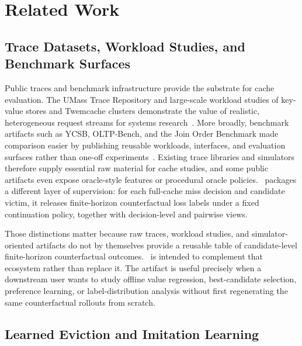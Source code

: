 \section{Related Work}
\label{sec:related-work}

\begingroup
\sloppy

\subsection{Trace Datasets, Workload Studies, and Benchmark Surfaces}

Public traces and benchmark infrastructure provide the substrate for cache evaluation. The UMass Trace Repository and large-scale workload studies of key-value stores and Twemcache clusters demonstrate the value of realistic, heterogeneous request streams for systems research~\cite{umasstracerepo,atikoglu2012kvworkload,yang2020twemcache}. More broadly, benchmark artifacts such as YCSB, OLTP-Bench, and the Join Order Benchmark made comparison easier by publishing reusable workloads, interfaces, and evaluation surfaces rather than one-off experiments~\cite{cooper2010ycsb,difallah2013oltpbench,leis2018job}. Existing trace libraries and simulators therefore supply essential raw material for cache studies, and some public artifacts even expose oracle-style features or procedural oracle policies. \lafc\ packages a different layer of supervision: for each full-cache miss decision and candidate victim, it releases finite-horizon counterfactual loss labels under a fixed continuation policy, together with decision-level and pairwise views.

Those distinctions matter because raw traces, workload studies, and simulator-oriented artifacts do not by themselves provide a reusable table of candidate-level finite-horizon counterfactual outcomes. \lafc\ is intended to complement that ecosystem rather than replace it. The artifact is useful precisely when a downstream user wants to study offline value regression, best-candidate selection, preference learning, or label-distribution analysis without first regenerating the same counterfactual rollouts from scratch.

\subsection{Learned Eviction and Imitation Learning}


